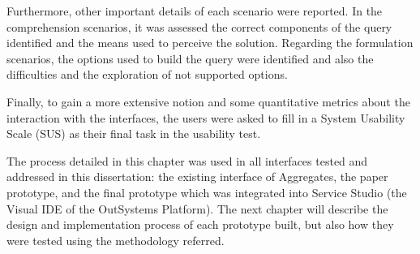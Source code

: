 Furthermore, other important details of each scenario were reported. In the comprehension scenarios, it was assessed the correct components of the query identified and the means used to perceive the solution. Regarding the formulation scenarios, the options used to build the query were identified and also the difficulties and the exploration of not supported options.

Finally, to gain a more extensive notion and some quantitative metrics about the interaction with the interfaces, the users were asked to fill in a System Usability Scale (SUS) \cite{system_usability_scale} as their final task in the usability test.

The process detailed in this chapter was used in all interfaces tested and addressed in this dissertation: the existing interface of Aggregates, the paper prototype, and the final prototype which was integrated into Service Studio (the Visual \gls{IDE} of the OutSystems Platform). The next chapter will describe the design and implementation process of each prototype built, but also how they were tested using the methodology referred.
